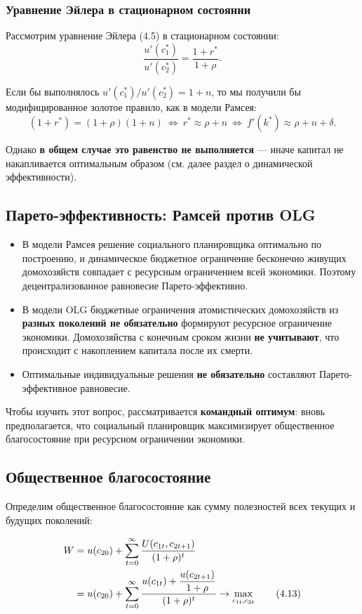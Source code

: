 \documentclass[10pt,a4paper]{article}
\begin{document}
\subsubsection{Уравнение Эйлера в стационарном состоянии}

Рассмотрим уравнение Эйлера (4.5) в стационарном состоянии:
$$\frac{u'(c_1^{*})}{u'(c_2^{*})} = \frac{1+r^{*}}{1+\rho}.$$

Если бы выполнялось $u'(c_1^{*})/u'(c_2^{*}) = 1+n$, то мы получили бы модифицированное золотое правило, как в модели Рамсея:
$$(1+r^{*}) = (1+\rho)(1+n) \ \Leftrightarrow\ r^{*} \approx \rho+n \ \Leftrightarrow\ f'(k^{*}) \approx \rho+n+\delta.$$

Однако \textbf{в общем случае это равенство не выполняется} — иначе капитал не накапливается оптимальным образом (см. далее раздел о динамической эффективности).

\subsection{Парето-эффективность: Рамсей против OLG}

\begin{itemize}[leftmargin=1.3em]
\item В модели Рамсея решение социального планировщика оптимально по построению, и динамическое бюджетное ограничение бесконечно живущих домохозяйств совпадает с ресурсным ограничением всей экономики. Поэтому децентрализованное равновесие Парето-эффективно.
\item В модели OLG бюджетные ограничения атомистических домохозяйств из \textbf{разных поколений не обязательно} формируют ресурсное ограничение экономики. Домохозяйства с конечным сроком жизни \textbf{не учитывают}, что происходит с накоплением капитала после их смерти.
\item Оптимальные индивидуальные решения \textbf{не обязательно} составляют Парето-эффективное равновесие.
\end{itemize}

Чтобы изучить этот вопрос, рассматривается \textbf{командный оптимум}: вновь предполагается, что социальный планировщик максимизирует общественное благосостояние при ресурсном ограничении экономики.

\subsection{Общественное благосостояние}

Определим общественное благосостояние как сумму полезностей всех текущих и будущих поколений:
\begin{formulabox}
\begin{align}
W &= u(c_{20}) + \sum_{t=0}^{\infty} \frac{U(c_{1t}, c_{2t+1})}{(1+\rho)^t} \notag\\
&= u(c_{20}) + \sum_{t=0}^{\infty} \frac{u(c_{1t}) + \dfrac{u(c_{2t+1})}{1+\rho}}{(1+\rho)^t} \to \max_{c_{1t}, c_{2t}} \tag{4.13}
\end{align}
\end{formulabox}
\end{document}
